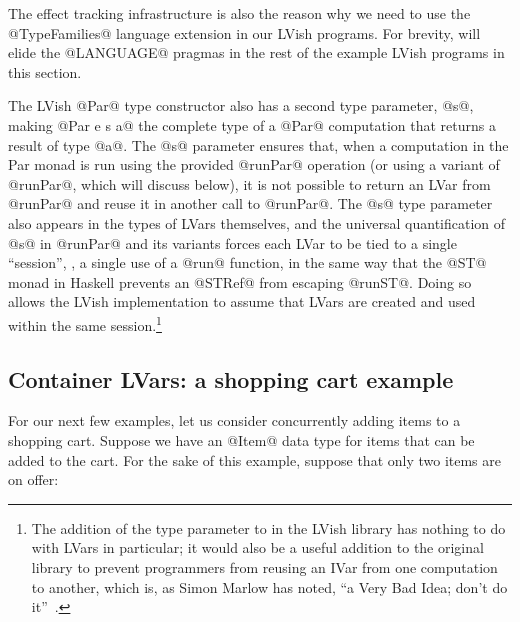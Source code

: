 The effect tracking infrastructure is also the reason why we need to
use the @TypeFamilies@ language extension in our LVish programs.  For
brevity,  will elide the @LANGUAGE@ pragmas in the rest
of the example LVish programs in this section.

The LVish @Par@ type constructor also has a second type parameter,
@s@, making @Par e s a@ the complete type of a @Par@ computation that
returns a result of type @a@.  The @s@ parameter ensures that, when a
computation in the Par monad is run using the provided @runPar@
operation (or using a variant of @runPar@, which  will discuss
below), it is not possible to return an LVar from @runPar@ and reuse
it in another call to @runPar@.  The @s@ type parameter also appears
in the types of LVars themselves, and the universal quantification of
@s@ in @runPar@ and its variants forces each LVar to be tied to a
single ``session'', \ie, a single use of a @run@ function, in the same
way that the @ST@ monad in Haskell prevents an @STRef@ from escaping
@runST@.  Doing so allows the LVish implementation to assume that
LVars are created and used within the same session.\footnote{The
  addition of the  type parameter to  in the LVish
  library has nothing to do with LVars in particular; it would also be
  a useful addition to the original  library to prevent
  programmers from reusing an IVar from one  computation to
  another, which is, as Simon Marlow has noted, ``a Very Bad Idea;
  don't do it''~\cite{marlow-book}.}



\subsection{Container LVars: a shopping cart example}\label{subsection:lvish-container-lvars}

For our next few examples, let us consider concurrently adding items
to a shopping cart.  Suppose we have an @Item@ data type for items
that can be added to the cart.  For the sake of this example, suppose
that only two items are on offer:

